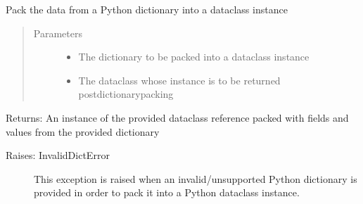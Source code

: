 \documentclass[letterpaper,10pt,english]{sphinxmanual}
\begin{document}

\begin{fulllineitems}
\label{\detokenize{Forge:Forge.pack_dict_into_dataclass}}
\sphinxAtStartPar
Pack the data from a Python dictionary into a dataclass instance
\begin{quote}\begin{description}
\item[{Parameters}] \leavevmode\begin{itemize}
\item {} 
\sphinxAtStartPar
{} \textendash{} The dictionary to be packed into a dataclass instance

\item {} 
\sphinxAtStartPar
{} \textendash{} The dataclass whose instance is to be returned post\sphinxhyphen{}dictionary\sphinxhyphen{}packing

\end{itemize}

\end{description}\end{quote}

\sphinxAtStartPar
Returns: An instance of the provided dataclass reference packed with fields and values from the provided dictionary
\begin{description}
\item[{Raises: InvalidDictError}] \leavevmode
\sphinxAtStartPar
This exception is raised when an invalid/unsupported Python dictionary is provided in order to pack it into
a Python dataclass instance.

\end{description}

\end{fulllineitems}
\end{document}
